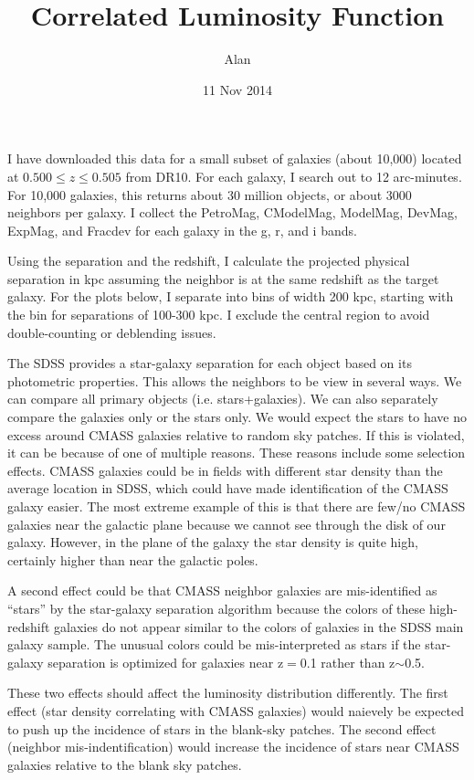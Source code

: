 \documentclass[10pt]{article}
\title{Correlated Luminosity Function}
\author{Alan}
\date{11 Nov 2014}
\begin{document}
\maketitle

I have downloaded this data for a small subset of galaxies (about 10,000) located at $0.500\leq z \leq 0.505$ from DR10. For each galaxy, I search out to 
12 arc-minutes. For 10,000 galaxies, this returns about 30 million objects, or about 3000 neighbors per galaxy. I collect the PetroMag, CModelMag, ModelMag, 
DevMag, ExpMag, and Fracdev for each galaxy in the g, r, and i bands.

Using the separation and the redshift, I calculate the projected physical separation in kpc assuming the neighbor is at the same redshift as the target 
galaxy. For the plots below, I separate into bins of width 200 kpc, starting with the bin for separations of 100-300 kpc. I exclude the central region to
avoid double-counting or deblending issues. 

The SDSS provides a star-galaxy separation for each object based on its photometric properties. This allows the neighbors to be view in several ways. We 
can compare all primary objects (i.e. stars+galaxies). We can also separately compare the galaxies only or the stars only. We would expect the stars to 
have no excess around CMASS galaxies relative to random sky patches. If this is violated, it can be because of one of multiple reasons. These reasons 
include some selection effects. CMASS galaxies could be in fields with different star density than the average location in SDSS, which could have made identification of the CMASS galaxy easier. The most extreme example of this is that there are few/no CMASS galaxies near the galactic plane because we cannot see through the disk of our galaxy. However, in the plane of the galaxy the star density is quite high, certainly higher than near the galactic poles. 

A second effect could be that CMASS neighbor galaxies are mis-identified as ``stars'' by the star-galaxy separation algorithm because the colors of
these high-redshift galaxies do not appear similar to the colors of galaxies in the SDSS main galaxy sample. The unusual colors could be mis-interpreted as stars if the star-galaxy separation is optimized for galaxies near z$=$0.1 rather than z$\sim$0.5.

These two effects should affect the luminosity distribution differently. The first effect (star density correlating with CMASS galaxies) would naievely be expected to push up the incidence of stars in the blank-sky patches. The second effect (neighbor mis-indentification) would increase the incidence of stars
near CMASS galaxies relative to the blank sky patches.
\end{document}
